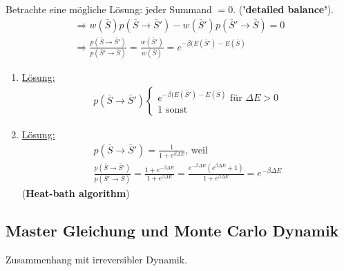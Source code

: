 \documentclass[12pt]{article}
\begin{document}
Betrachte eine mögliche Lösung: jeder Summand $=0$. (\textbf{'detailed balance'}).
 \begin{align}
\Rightarrow   w(\bar{S}) p(\bar{S} \rightarrow \bar{S}')- w(\bar{S}') p(\bar{S}' \rightarrow \bar{S}) =0 \\
\Rightarrow  \frac{p(\bar{S} \rightarrow \bar{S}')}{p(\bar{S}' \rightarrow  \bar{S})} = \frac{w(\bar{S}')}{w(\bar{S})} = e^{-\beta(E(\bar{S}')- E(\bar{S})}
\end{align}
\begin{enumerate}
\item \underline{Lösung:}
 \begin{align}
p(\bar{S} \rightarrow \bar{S}')
\begin{cases}
e^{-\beta(E(\bar{S}')- E(\bar{S})} \text{ für } \Delta E > 0 \\
1 \text{ sonst}
\end{cases}
\end{align} 
\item \underline{Lösung:}
\begin{align*}
p(\bar{S} \rightarrow \bar{S}') = \frac{1}{1+ e^{\beta \Delta E}} \mbox{, weil } \\ 
\frac{p(\bar{S} \rightarrow \bar{S}')}{p(\bar{S}' \rightarrow \bar{S})} = \frac{1+e^{-\beta \Delta E} }{1+e^{\beta \Delta E}} = \frac{e^{-\beta \Delta E} (e^{\beta \Delta E}+1)}{1+e^{\beta \Delta E}}= e^{-\beta \Delta E}
\end{align*}
(\textbf{Heat-bath algorithm})
\end{enumerate}
\subsection{Master Gleichung und Monte Carlo Dynamik}
Zusammenhang mit irreversibler Dynamik.
\end{document}

